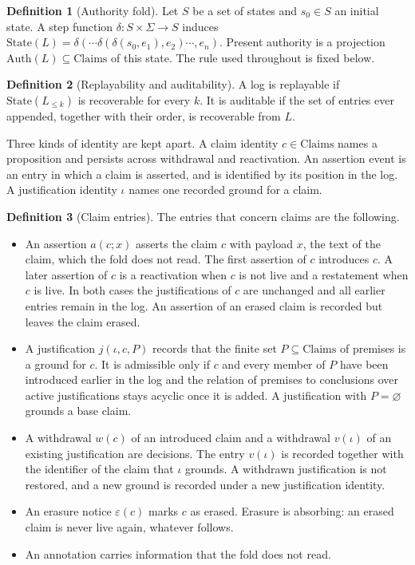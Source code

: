 \documentclass[11pt]{article}
\theoremstyle{plain}
\theoremstyle{definition}
\newtheorem{definition}{Definition}
\theoremstyle{remark}
\begin{document}
\begin{definition}[Authority fold]
Let $S$ be a set of states and $s_0 \in S$ an initial state. A step function $\delta : S \times \Sigma \to S$ induces $\mathrm{State}(L) = \delta(\cdots\delta(\delta(s_0,e_1),e_2)\cdots,e_n)$. Present authority is a projection $\mathrm{Auth}(L)\subseteq \mathrm{Claims}$ of this state. The rule used throughout is fixed below.
\end{definition}

\begin{definition}[Replayability and auditability]
A log is replayable if $\mathrm{State}(L_{\le k})$ is recoverable for every $k$. It is auditable if the set of entries ever appended, together with their order, is recoverable from $L$.
\end{definition}

Three kinds of identity are kept apart. A claim identity $c\in\mathrm{Claims}$ names a proposition and persists across withdrawal and reactivation. An assertion event is an entry in which a claim is asserted, and is identified by its position in the log. A justification identity $\iota$ names one recorded ground for a claim.

\begin{definition}[Claim entries]
The entries that concern claims are the following.
\begin{itemize}
\item An assertion $a(c;x)$ asserts the claim $c$ with payload $x$, the text of the claim, which the fold does not read. The first assertion of $c$ introduces $c$. A later assertion of $c$ is a reactivation when $c$ is not live and a restatement when $c$ is live. In both cases the justifications of $c$ are unchanged and all earlier entries remain in the log. An assertion of an erased claim is recorded but leaves the claim erased.
\item A justification $j(\iota,c,P)$ records that the finite set $P\subseteq\mathrm{Claims}$ of premises is a ground for $c$. It is admissible only if $c$ and every member of $P$ have been introduced earlier in the log and the relation of premises to conclusions over active justifications stays acyclic once it is added. A justification with $P=\varnothing$ grounds a base claim.
\item A withdrawal $w(c)$ of an introduced claim and a withdrawal $v(\iota)$ of an existing justification are decisions. The entry $v(\iota)$ is recorded together with the identifier of the claim that $\iota$ grounds. A withdrawn justification is not restored, and a new ground is recorded under a new justification identity.
\item An erasure notice $\varepsilon(c)$ marks $c$ as erased. Erasure is absorbing: an erased claim is never live again, whatever follows.
\item An annotation carries information that the fold does not read.
\end{itemize}
\end{definition}
\end{document}
